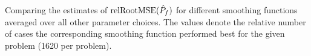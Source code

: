 Comparing the estimates of $\textup{relRootMSE}(\hat{P}_f)$ for different smoothing functions averaged over  all other parameter choices. The values denote the relative number of cases the corresponding smoothing function performed best for the given problem (1620 per problem).